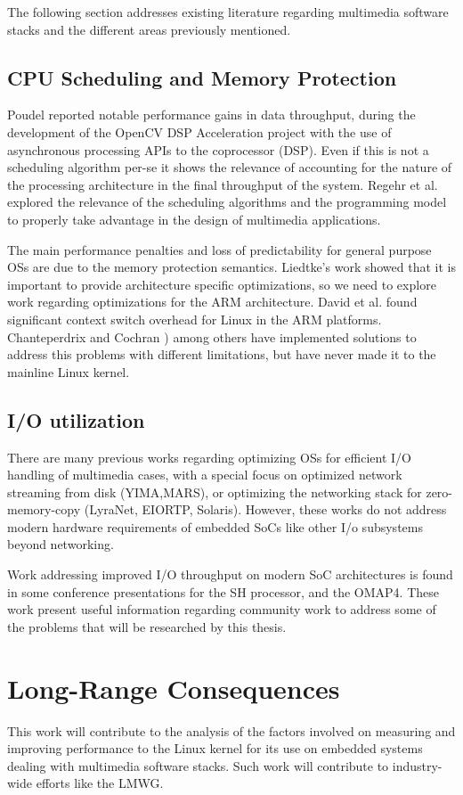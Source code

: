 The following section addresses existing literature regarding multimedia software stacks and the different areas previously mentioned.

\subsection{CPU Scheduling and Memory Protection}
Poudel\cite{Poudel:ys} reported notable performance gains in data throughput, during the development of the OpenCV DSP Acceleration project with the use of asynchronous processing APIs to the coprocessor (\ac{DSP}). Even if this is not a scheduling algorithm per-se it shows the relevance of accounting for the nature of the processing architecture in the final throughput of the system. Regehr et al.\cite{Regehr00operatingsystem} explored the relevance of the scheduling algorithms and the programming model to properly take advantage in the design of multimedia applications.

The main performance penalties and loss of predictability for general purpose \acp{OS} are due to the memory protection semantics\cite{Blackham_SH_11}. Liedtke's\citep{Liedtke:1995kx}  work showed that it is important to provide architecture specific optimizations, so we need to explore work regarding optimizations for the \ac{ARM} architecture. David et al.\citep{David:2007:CSO:1281700.1281703}  found significant context switch overhead for Linux in the \ac{ARM} platforms. Chanteperdrix and Cochran \citep{Chanteperdrix:2009fk}) among others have implemented solutions to address this problems with different limitations, but have never made it to the mainline Linux kernel.

\subsection{I/O utilization}
There are many previous works regarding optimizing \acp{OS} for efficient I/O handling of multimedia cases, with a special focus on optimized network streaming from disk (YIMA\cite{Shahabi:2002vn},MARS\cite{Jane98enhancementsto}), or optimizing the networking stack for zero-memory-copy (LyraNet\cite{10.1109/RTCSA.2005.57},  EIORTP\cite{springerlink:10.1007/s11390-006-0989-5}, Solaris\cite{Chu96zero-copytcp}). However, these works do not address modern hardware requirements of embedded \ac{SoC}s like other I/o subsystems beyond networking.

Work addressing improved I/O throughput on modern \ac{SoC} architectures is found in some conference presentations for the SH processor\cite{Parker:2009fk}, and the OMAP4\cite{Clark:2010uq}. These work present useful information regarding community work to address some of the problems that will be researched by this thesis.

\section{Long-Range Consequences}
This work will contribute to the analysis of the factors involved on measuring and improving performance to the Linux kernel for its use on embedded systems dealing with multimedia software stacks. Such work will contribute to industry-wide efforts like the \ac{LMWG}. 
